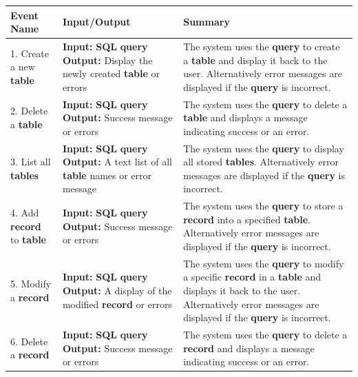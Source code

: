 \documentclass[12pt, titlepage]{article}
\begin{document}
\begin{table}[h!]
    \centering
    \begin{tabular}{|l|p{4cm}|p{7cm}|}
    \hline
    \textbf{Event Name} & \textbf{Input/Output} & \textbf{Summary} \\
    \hline
    1. Create a new \textbf{table} & \textbf{Input:} \textbf{SQL} \textbf{query} \newline \textbf{Output:} Display the newly created \textbf{table} or errors & The system uses the \textbf{query} to create a \textbf{table} and display it back to the user. Alternatively error messages are displayed if the \textbf{query} is incorrect.\\
    \hline
    2. Delete a \textbf{table} & \textbf{Input:} \textbf{SQL} \textbf{query} \newline \textbf{Output:} Success message or errors & The system uses the \textbf{query} to delete a \textbf{table} and displays a message indicating success or an error.\\
    \hline
    3. List all \textbf{tables} & \textbf{Input:} \textbf{SQL} \textbf{query} \newline \textbf{Output:} A text list of all \textbf{table} names or error message & The system uses the \textbf{query} to display all stored \textbf{tables}. Alternatively error messages are displayed if the \textbf{query} is incorrect.\\
    \hline
    4. Add \textbf{record} to \textbf{table} & \textbf{Input:} \textbf{SQL} \textbf{query} \newline \textbf{Output:} Success message or errors & The system uses the \textbf{query} to store a \textbf{record} into a specified \textbf{table}. Alternatively error messages are displayed if the \textbf{query} is incorrect.\\
    \hline
    5. Modify a \textbf{record} & \textbf{Input:} \textbf{SQL} \textbf{query} \newline \textbf{Output:} A display of the modified \textbf{record} or errors & The system uses the \textbf{query} to modify a specific \textbf{record} in a \textbf{table} and displays it back to the user. Alternatively error messages are displayed if the \textbf{query} is incorrect.\\
    \hline
    6. Delete a \textbf{record} & \textbf{Input:} \textbf{SQL} \textbf{query} \newline \textbf{Output:} Success message or errors &  The system uses the \textbf{query} to delete a \textbf{record} and displays a message indicating success or an error.\\

\end{tabular}
\end{table}
\end{document}
